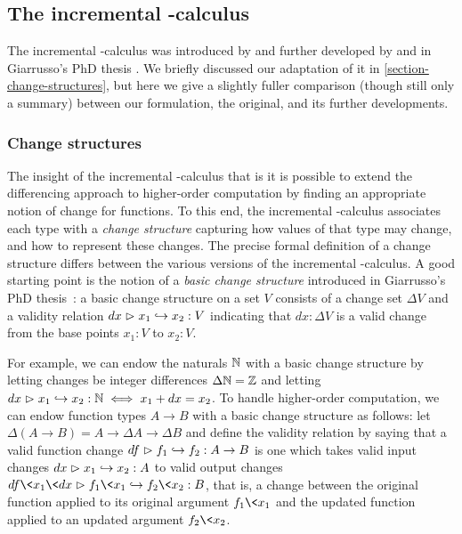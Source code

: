 
\subsection{The incremental \boldfn-calculus}
\label{section-incremental-lambda-calculus}

The incremental \fn-calculus was introduced by \citet*{incremental} and further
developed by \citet*{DBLP:conf/esop/GiarrussoRS19} and in Giarrusso's PhD thesis
\citeyearpar{DBLP:phd/dnb/Giarrusso20}.
%
We briefly discussed our adaptation of it in \cref{section-change-structures},
but here we give a slightly fuller comparison (though still only a summary)
between our formulation, the original, and its further developments.


\subsubsection{Change structures}

The insight of the incremental \fn-calculus that is it is possible to extend the differencing approach to higher-order computation by finding an appropriate notion of change for functions.
%
To this end, the incremental \fn-calculus associates each type with a \emph{change structure} capturing how values of that type may change, and how to represent these changes.
%
The precise formal definition of a change structure differs between the various versions of the incremental \fn-calculus.
%
A good starting point is the notion of a \emph{basic change structure} introduced in Giarrusso's PhD thesis~\citeyearpar[chapter 12, definition 12.1.1]{DBLP:phd/dnb/Giarrusso20}:
%
a basic change structure on a set $V$ consists of a change set $\Delta V$ and a validity relation $\gvalid{V}{dx}{x_1}{x_2}$ indicating that $dx : \Delta V$ is a valid change from the base points $x_1 : V$ to $x_2 : V$.

For example, we can endow the naturals $\N$ with a basic change structure by
letting changes be integer differences $\Delta \N = \mathbb{Z}$ and letting
$\gvalid{\N}{dx}{x_1}{x_2} \iff x_1 + dx = x_2$.
%
To handle higher-order computation, we can endow function types $A \to B$ with a
basic change structure as follows: let $\Delta(A \to B) = A \to \Delta A \to
\Delta B$ and define the validity relation by saying that a valid function
change $\gvalid{A \to B}{df}{f_1}{f_2}$ is one which takes valid input changes
$\gvalid{A}{dx}{x_1}{x_2}$ to valid output changes
$\gvalid{B}{df\<x_1\<dx}{f_1\<x_1}{f_2\<x_2}$, that is, a change between the
original function applied to its original argument $f_1\<x_1$ and the updated
function applied to an updated argument $f_2\<x_2$.

